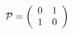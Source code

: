 \begin{equation}
\mathcal{P}=\left(\begin{array}{cc} 0 & 1 \cr 1 & 0
\end{array}\right) \label{e20}
\end{equation}

